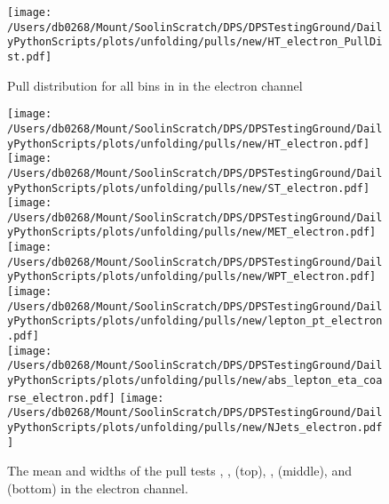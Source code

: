 \begin{figure*}[htpb]
	\centering
	\texttt{[image: /Users/db0268/Mount/SoolinScratch/DPS/DPSTestingGround/DailyPythonScripts/plots/unfolding/pulls/new/HT\_electron\_PullDist.pdf]}
	\caption[Pull distribution for all bins in \HT{} in the electron channel]{Pull distribution for all bins in \HT{} in the electron channel}
	\label{fig:pullExample}
\end{figure*}

\begin{figure*}[htpb]
	\centering
	\texttt{[image: /Users/db0268/Mount/SoolinScratch/DPS/DPSTestingGround/DailyPythonScripts/plots/unfolding/pulls/new/HT\_electron.pdf]} 
	\texttt{[image: /Users/db0268/Mount/SoolinScratch/DPS/DPSTestingGround/DailyPythonScripts/plots/unfolding/pulls/new/ST\_electron.pdf]} 
	\texttt{[image: /Users/db0268/Mount/SoolinScratch/DPS/DPSTestingGround/DailyPythonScripts/plots/unfolding/pulls/new/MET\_electron.pdf]} \\
	\texttt{[image: /Users/db0268/Mount/SoolinScratch/DPS/DPSTestingGround/DailyPythonScripts/plots/unfolding/pulls/new/WPT\_electron.pdf]} 
	\texttt{[image: /Users/db0268/Mount/SoolinScratch/DPS/DPSTestingGround/DailyPythonScripts/plots/unfolding/pulls/new/lepton\_pt\_electron.pdf]} \\
	\texttt{[image: /Users/db0268/Mount/SoolinScratch/DPS/DPSTestingGround/DailyPythonScripts/plots/unfolding/pulls/new/abs\_lepton\_eta\_coarse\_electron.pdf]} 
	\texttt{[image: /Users/db0268/Mount/SoolinScratch/DPS/DPSTestingGround/DailyPythonScripts/plots/unfolding/pulls/new/NJets\_electron.pdf]} 
	\caption[The mean and widths of the pull tests \HT{}, \ST{}, \MET{} (top), \WPT{}, \LPT{} (middle), \LETA{} and \NJET{} (bottom) in the electron channel.]{The mean and widths of the pull tests \HT{}, \ST{}, \MET{} (top), \WPT{}, \LPT{} (middle), \LETA{} and \NJET{} (bottom) in the electron channel.}
	\label{fig:Pullse}
\end{figure*}

